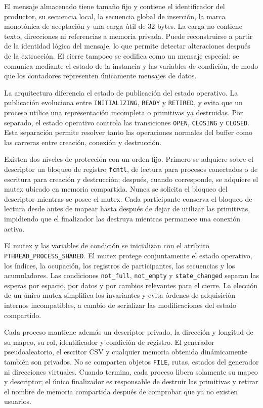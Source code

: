 \documentclass[conference]{IEEEtran}
\begin{document}
El mensaje almacenado tiene tamaño fijo y contiene el identificador del productor, su secuencia local, la secuencia global de inserción, la marca monotónica de aceptación y una carga útil de 32 bytes. La carga no contiene texto, direcciones ni referencias a memoria privada. Puede reconstruirse a partir de la identidad lógica del mensaje, lo que permite detectar alteraciones después de la extracción. El cierre tampoco se codifica como un mensaje especial: se comunica mediante el estado de la instancia y las variables de condición, de modo que los contadores representen únicamente mensajes de datos.

La arquitectura diferencia el estado de publicación del estado operativo. La publicación evoluciona entre \texttt{INITIALIZING}, \texttt{READY} y \texttt{RETIRED}, y evita que un proceso utilice una representación incompleta o primitivas ya destruidas. Por separado, el estado operativo controla las transiciones \texttt{OPEN}, \texttt{CLOSING} y \texttt{CLOSED}. Esta separación permite resolver tanto las operaciones normales del buffer como las carreras entre creación, conexión y destrucción.

Existen dos niveles de protección con un orden fijo. Primero se adquiere sobre el descriptor un bloqueo de registro \texttt{fcntl}, de lectura para procesos conectados o de escritura para creación y destrucción; después, cuando corresponde, se adquiere el mutex ubicado en memoria compartida. Nunca se solicita el bloqueo del descriptor mientras se posee el mutex. Cada participante conserva el bloqueo de lectura desde antes de mapear hasta después de dejar de utilizar las primitivas, impidiendo que el finalizador las destruya mientras permanece una conexión activa.

El mutex y las variables de condición se inicializan con el atributo \texttt{PTHREAD\_PROCESS\_SHARED}. El mutex protege conjuntamente el estado operativo, los índices, la ocupación, los registros de participantes, las secuencias y los acumuladores. Las condiciones \texttt{not\_full}, \texttt{not\_empty} y \texttt{state\_changed} separan las esperas por espacio, por datos y por cambios relevantes para el cierre. La elección de un único mutex simplifica los invariantes y evita órdenes de adquisición internos incompatibles, a cambio de serializar las modificaciones del estado compartido.

Cada proceso mantiene además un descriptor privado, la dirección y longitud de su mapeo, su rol, identificador y condición de registro. El generador pseudoaleatorio, el escritor CSV y cualquier memoria obtenida dinámicamente también son privados. No se comparten objetos \texttt{FILE}, rutas, estados del generador ni direcciones virtuales. Cuando termina, cada proceso libera solamente su mapeo y descriptor; el único finalizador es responsable de destruir las primitivas y retirar el nombre de memoria compartida después de comprobar que ya no existen usuarios.
\end{document}
